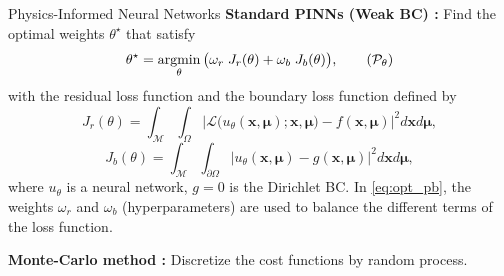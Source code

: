 \begin{frame}{Physics-Informed Neural Networks}
	\textbf{Standard PINNs (Weak BC) :} Find the optimal weights $\theta^\star$ that satisfy
	\begin{equation}
		\label{eq:opt_pb}
		\theta^\star = \argmin_{\theta}	\big( \omega_r \; J_r(\theta) + \omega_b \; J_b(\theta) \big),
		\tag{$\mathcal{P}_\theta$}
	\end{equation}
	with the residual loss function and the boundary loss function defined by
	\begin{equation*}
		J_r(\theta) =
		\int_{\mathcal{M}}\int_{\Omega}
		\big| \mathcal{L}\big(u_\theta(\bm{x},\bm{\mu});\bm{x},\bm{\mu}\big)-f(\bm{x},\bm{\mu}) \big|^2 d\bm{x} d\bm{\mu},
	\end{equation*}
	\begin{equation*}
		J_b(\theta) =
		\int_{\mathcal{M}}\int_{\partial \Omega} \big| u_\theta(\bm{x},\bm{\mu}) - g(\bm{x},\bm{\mu}) \big|^2 d\bm{x} d\bm{\mu},
	\end{equation*}
	where $u_\theta$ is a neural network, $g=0$ is the Dirichlet BC. In \eqref{eq:opt_pb}, the weights $\omega_r$ and $\omega_b$ (hyperparameters) are used to balance the different terms of the loss function.

	\vspace{5pt}
	\textbf{Monte-Carlo method :} Discretize the cost functions by random process.
\end{frame}

